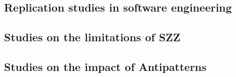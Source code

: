 \label{related}

\subsection{Replication studies in software engineering}




\subsection{Studies on the limitations of SZZ}



\subsection{Studies on the impact of Antipatterns}